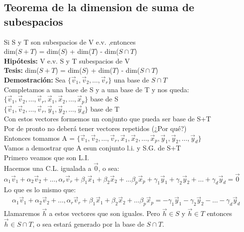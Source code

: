 \documentclass[11pt]{article}
\begin{document}
\subsection{Teorema de la dimension de suma de subespacios}
Si S y T son subespacios de V e.v. ,entonces\\
dim($S+T$) = dim($S$) + dim($T$) - dim($S \cap T$)\\
{\bfseries {Hipótesis:}} V e.v. S y T subespacios de V  \\
{\bfseries {Tesis:}} dim($S+T$) = dim($S$) + dim($T$) - dim($S \cap T$)\\
{\bfseries {Demostración:}} Sea $\{\vec{v}_1, \vec{v}_2, \hdots, \vec{v}_r\}$ una base de $S \cap T$\\
Completamos a una base de S y a una base de T y nos queda: \\
$\{\vec{v}_1, \vec{v}_2, \hdots, \vec{v}_r, \vec{x}_1, \vec{x}_2, \hdots, \vec{x}_p\}$ base de S \\
$\{\vec{v}_1, \vec{v}_2, \hdots, \vec{v}_r, \vec{y}_1, \vec{y}_2, \hdots, \vec{y}_d\}$ base de T \\
Con estos vectores formemos un conjunto que pueda ser base de S+T\\
Por de pronto no deberá tener vectores repetidos (¿Por qué?)\\
Entonces tomamos A = $\{\vec{v}_1, \vec{v}_2, \hdots, \vec{v}_r, \vec{x}_1, \vec{x}_2, \hdots, \vec{x}_p, \vec{y}_1, \vec{y}_2, \hdots, \vec{y}_d\}$\\
Vamos a demostrar que A esun conjunto l.i. y S.G. de S+T\\
Primero veamos que son L.I.\\
Hacemos una C.L. igualada a $\vec{0}$, o sea: \\
$\alpha_1\vec{v}_1 + \alpha_2\vec{v}_2 + \hdots, \alpha_r\vec{v}_r + \beta_1\vec{x}_1 + \beta_2\vec{x}_2 + \hdots \beta_p\vec{x}_p + \gamma_1\vec{y}_1 + \gamma_2\vec{y}_2 + \hdots + \gamma_d\vec{y}_d = \vec{0}$\\
Lo que es lo mismo que: \\
\begin{align}
\alpha_1\vec{v}_1 + \alpha_2\vec{v}_2 + \hdots, \alpha_r\vec{v}_r + \beta_1\vec{x}_1 + \beta_2\vec{x}_2 + \hdots \beta_p\vec{x}_p  = - \gamma_1\vec{y}_1 - \gamma_2\vec{y}_2 - \hdots - \gamma_d\vec{y}_d
\end{align}
Llamaremos $\vec{h}$ a estos vectores que son iguales. Pero $\vec{h} \in S$ y $\vec{h} \in T$ entonces $\vec{h} \in S \cap T$, o sea estará generado por la base de $S \cap T$. \\
\end{document}

